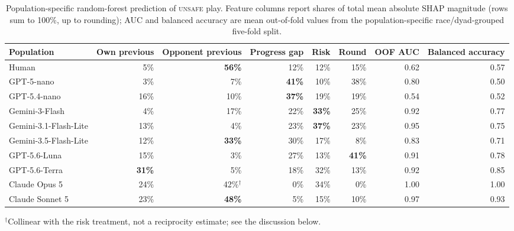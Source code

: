 \documentclass[sigconf,anonymous]{aamas}
\newcommand{\Unsafe}{\textsc{unsafe}}
\begin{document}
\begin{table}[t]
    \caption{Population-specific random-forest prediction of \Unsafe{}
    play. Feature columns report shares of total mean absolute SHAP
    magnitude (rows sum to 100\%, up to rounding); AUC and balanced
    accuracy are mean out-of-fold values from the population-specific
    race/dyad-grouped five-fold split.}
    \label{tab:feature-importance}
    \centering
    \footnotesize
    \setlength{\tabcolsep}{4.5pt}
    \begin{tabular}{@{}lrrrrrrr@{}}
        \toprule
        Population
        & Own previous
        & Opponent previous
        & Progress gap
        & Risk
        & Round
        & OOF AUC
        & Balanced accuracy \\
        \midrule
        Human                   & 5\%  & \textbf{56\%} & 12\% & 12\%          & 15\% & 0.62 & 0.57 \\
        GPT-5-nano              & 3\%  & 7\%           & \textbf{41\%} & 10\% & 38\% & 0.80 & 0.50 \\
        GPT-5.4-nano            & 16\% & 10\%          & \textbf{37\%} & 19\% & 19\% & 0.54 & 0.52 \\
        Gemini-3-Flash          & 4\%  & 17\%          & 22\% & \textbf{33\%} & 25\% & 0.92 & 0.77 \\
        Gemini-3.1-Flash-Lite   & 13\% & 4\%           & 23\% & \textbf{37\%} & 23\% & 0.95 & 0.75 \\
        Gemini-3.5-Flash-Lite   & 12\% & \textbf{33\%} & 30\% & 17\%          & 8\%  & 0.83 & 0.71 \\
        GPT-5.6-Luna            & 15\% & 3\%           & 27\% & 13\%          & \textbf{41\%} & 0.91 & 0.78 \\
        GPT-5.6-Terra           & \textbf{31\%} & 5\% & 18\% & 32\% & 13\% & 0.92 & 0.85 \\
        Claude Opus 5           & 24\% & 42\%$^\dagger$ & 0\% & 34\%         & 0\%  & 1.00 & 1.00 \\
        Claude Sonnet 5         & 23\% & \textbf{48\%} & 5\%  & 15\%          & 10\% & 0.97 & 0.93 \\
        \bottomrule
    \end{tabular}

    \vspace{2pt}
    {\footnotesize $^\dagger$Collinear with the risk treatment, not a
    reciprocity estimate; see the discussion below.\par}
\end{table}
\end{document}
